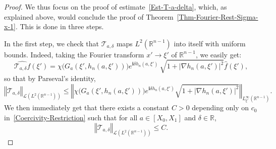 \documentclass[10pt]{amsart}
\theoremstyle{definition}\newtheorem{defi}[theo]{Definition}\newtheorem{rema}[theo]{Remark}\newtheorem{exam}[theo]{Example}\newtheorem{exem}[theo]{Example}\newtheorem{nota}[theo]{Notation}
\newcommand{\scL}{\mathscr{L}}
\newcommand{\scT}{\mathscr{T}}
\newcommand*\R{\mathbb{R}}
\renewcommand{\i}{\mathbf{i}}
\newcommand{\norm}[1]{\left\Vert#1\right\Vert}
\renewcommand{\leq}{\leqslant}
\begin{document}
\begin{proof}
We thus focus on the proof of estimate~\eqref{Est-T-a-delta}, which, as explained above, would conclude the proof of Theorem~\ref{Thm-Fourier-Rest-Sigma-x-1}. This is done in three steps.

In the first step, we check that $\scT_{a, \delta}$ maps $L^2(\R^{n-1})$ into itself with uniform bounds. Indeed, taking the Fourier transform $x' \to \xi'$ of $\R^{n-1}$, we easily get:
\[
\widehat {\scT_{a, \delta} f}(\xi') =
\chi\big(G_a(\xi', h_n(a,\xi'))\big) e^{\i \delta h_n(a,\xi')}
\,
\sqrt{1 + \left|\nabla h_n(a,\xi')\right|^2}
\widehat {f} (\xi'),
\]
so that by Parseval's identity,
\[
\norm{
\scT_{a,\delta} }_{\scL\left(L^{2}\left(\R^{n-1}\right)\right)}
\leq
\norm{
\chi\big(G_a(\xi', h_n(a,\xi'))\big) e^{\i \delta h_n(a,\xi')}
\sqrt{1 + \left|\nabla h_n(a,\xi')\right|^2} }_{L^\infty_{\xi'}(\R^{n-1})}.
\]
We then immediately get that there exists a constant $C>0$ depending only on $c_0$ in~\eqref{Coercivity-Restriction} such that for all $a \in [X_0, X_1]$ and $\delta \in \R$,
\begin{equation}\label{Est-T-a-delta-L2-L2}
\norm{
\scT_{a,\delta} }_{\scL\left(L^{2}\left(\R^{n-1}\right)\right)}
\leqslant C.
\end{equation}


\end{proof}
\end{document}
